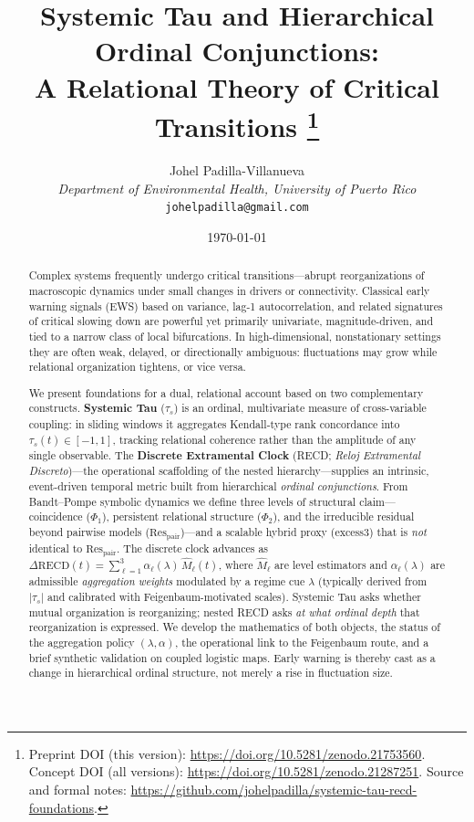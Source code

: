 \documentclass[11pt,a4paper]{article}
\title{\textbf{Systemic Tau and Hierarchical Ordinal Conjunctions: \\
A Relational Theory of Critical Transitions}%
\thanks{Preprint DOI (this version):
  \url{https://doi.org/10.5281/zenodo.21753560}.
  Concept DOI (all versions):
  \url{https://doi.org/10.5281/zenodo.21287251}.
  Source and formal notes:
  \url{https://github.com/johelpadilla/systemic-tau-recd-foundations}.}}
\author{
Johel Padilla-Villanueva \\
\textit{Department of Environmental Health, University of Puerto Rico} \\
\texttt{johelpadilla@gmail.com}
}
\date{\today}
\begin{document}
\maketitle

\begin{abstract}
Complex systems frequently undergo critical transitions---abrupt
reorganizations of macroscopic dynamics under small changes in drivers or
connectivity. Classical early warning signals (EWS) based on variance,
lag-1 autocorrelation, and related signatures of critical slowing down are
powerful yet primarily univariate, magnitude-driven, and tied to a narrow
class of local bifurcations. In high-dimensional, nonstationary settings
they are often weak, delayed, or directionally ambiguous: fluctuations may
grow while relational organization tightens, or vice versa.

We present foundations for a dual, relational account based on two
complementary constructs.
\textbf{Systemic Tau} ($\tau_s$) is an ordinal, multivariate measure of
cross-variable coupling: in sliding windows it aggregates Kendall-type
rank concordance into $\tau_s(t)\in[-1,1]$, tracking relational coherence
rather than the amplitude of any single observable. The
\textbf{Discrete Extramental Clock} (RECD; \emph{Reloj Extramental
Discreto})---the operational scaffolding of the nested hierarchy---supplies
an intrinsic, event-driven temporal metric built from hierarchical
\emph{ordinal conjunctions}. From Bandt--Pompe symbolic dynamics we define
three levels of structural claim---coincidence ($\Phi_1$), persistent
relational structure ($\Phi_2$), and the irreducible residual beyond
pairwise models ($\mathrm{Res}_{\mathrm{pair}}$)---and a scalable hybrid
proxy (excess3) that is \emph{not} identical to
$\mathrm{Res}_{\mathrm{pair}}$. The discrete clock advances as
$\Delta\mathrm{RECD}(t)=\sum_{\ell=1}^{3}\alpha_\ell(\lambda)\,\widehat{M}_\ell(t)$,
where $\widehat{M}_\ell$ are level estimators and
$\alpha_\ell(\lambda)$ are admissible \emph{aggregation weights}
modulated by a regime cue $\lambda$ (typically derived from $|\tau_s|$
and calibrated with Feigenbaum-motivated scales). Systemic Tau asks
whether mutual organization is reorganizing; nested RECD asks
\emph{at what ordinal depth} that reorganization is expressed. We develop
the mathematics of both objects, the status of the aggregation policy
$(\lambda,\alpha)$, the operational link to the Feigenbaum route, and a
brief synthetic validation on coupled logistic maps. Early warning is
thereby cast as a change in hierarchical ordinal structure, not merely a
rise in fluctuation size.
\end{abstract}
\end{document}
